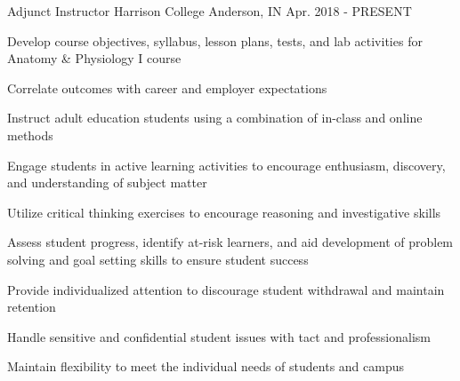 \begin{cventries}
  \cventry
    {Adjunct Instructor}
    {Harrison College}
    {Anderson, IN}
    {Apr. 2018 - PRESENT}
    {
      \begin{cvitems}
      \item {Develop course objectives, syllabus, lesson plans, tests, and lab activities for Anatomy \& Physiology I course} 
      \item {Correlate outcomes with career and employer expectations}
        \item {Instruct adult education students using a combination of in-class and online methods}
        \item {Engage students in active learning activities to encourage enthusiasm, discovery, and understanding of subject matter}
      \item {Utilize critical thinking exercises to encourage reasoning and investigative skills}
      \item {Assess student progress, identify at-risk learners, and aid development of problem solving and goal setting skills to ensure student success}
      \item {Provide individualized attention to discourage student withdrawal and maintain retention}
      \item {Handle sensitive and confidential student issues with tact and professionalism}
      \item {Maintain flexibility to meet the individual needs of students and campus}
  \end{cvitems}
    }


\end{cventries}
